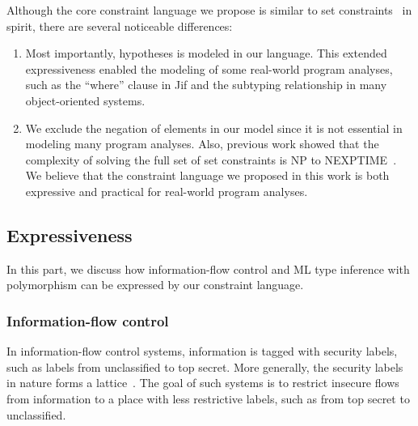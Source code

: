 Although the core constraint language we propose is similar to set
constraints~\cite{aiken-setconstraint} in spirit, there are several
noticeable differences:

\begin{enumerate}

\item Most importantly, hypotheses is modeled in our language. This extended
expressiveness enabled the modeling of some real-world program analyses, such
as the ``where'' clause in Jif and the subtyping relationship in many
object-oriented systems. 

\item We exclude the negation of elements in our model since it is not
essential in modeling many program analyses. Also, previous work showed that
the complexity of solving the full set of set constraints is NP to
NEXPTIME~\cite{aiken-complexity}. We believe that the constraint language we
proposed in this work is both expressive and practical for real-world program
analyses.

\end{enumerate}

\subsection{Expressiveness}


In this part, we discuss how information-flow control and ML type inference
with polymorphism can be expressed by our constraint language.

\subsubsection{Information-flow control}

In information-flow control systems, information is tagged with security
labels, such as labels from unclassified to top secret. More generally, the
security labels in nature forms a lattice~\cite{denning-lattice}. The goal of
such systems is to restrict insecure flows from information to a place with
less restrictive labels, such as from top secret to unclassified. 


